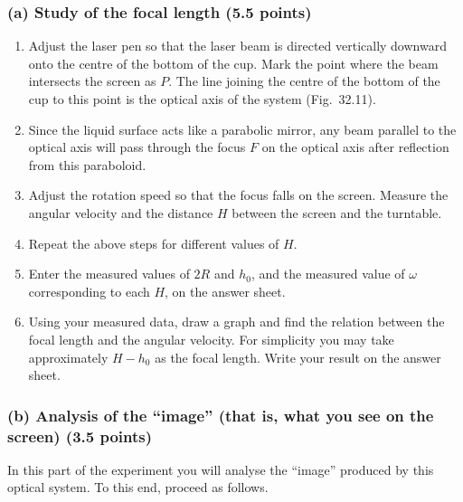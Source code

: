 \subsubsection*{(a) Study of the focal length (5.5 points)}

\begin{enumerate}
\item[(1)] Adjust the laser pen so that the laser beam is directed vertically downward onto the centre of the bottom of the cup. Mark the point where the beam intersects the screen as $P$. The line joining the centre of the bottom of the cup to this point is the optical axis of the system (Fig.~32.11).
\item[(2)] Since the liquid surface acts like a parabolic mirror, any beam parallel to the optical axis will pass through the focus $F$ on the optical axis after reflection from this paraboloid.
\item[(3)] Adjust the rotation speed so that the focus falls on the screen. Measure the angular velocity and the distance $H$ between the screen and the turntable.
\item[(4)] Repeat the above steps for different values of $H$.
\item[(5)] Enter the measured values of $2R$ and $h_0$, and the measured value of $\omega$ corresponding to each $H$, on the answer sheet.
\item[(6)] Using your measured data, draw a graph and find the relation between the focal length and the angular velocity. For simplicity you may take approximately $H-h_0$ as the focal length. Write your result on the answer sheet.
\end{enumerate}

\subsubsection*{(b) Analysis of the ``image'' (that is, what you see on the screen) (3.5 points)}

In this part of the experiment you will analyse the ``image'' produced by this optical system. To this end, proceed as follows.

